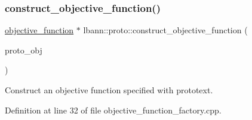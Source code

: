 \mbox{\label{namespacelbann_1_1proto_a2b55ede441a057291e047cf4e7352481}} 
\subsubsection{\texorpdfstring{construct\+\_\+objective\+\_\+function()}{construct\_objective\_function()}}
{\footnotesize\ttfamily \hyperlink{classlbann_1_1objective__function}{objective\+\_\+function} $\ast$ lbann\+::proto\+::construct\+\_\+objective\+\_\+function (\begin{DoxyParamCaption}\item[{const lbann\+\_\+data\+::\+Objective\+Function \&}]{proto\+\_\+obj }\end{DoxyParamCaption})}

Construct an objective function specified with prototext. 

Definition at line 32 of file objective\+\_\+function\+\_\+factory.\+cpp.


